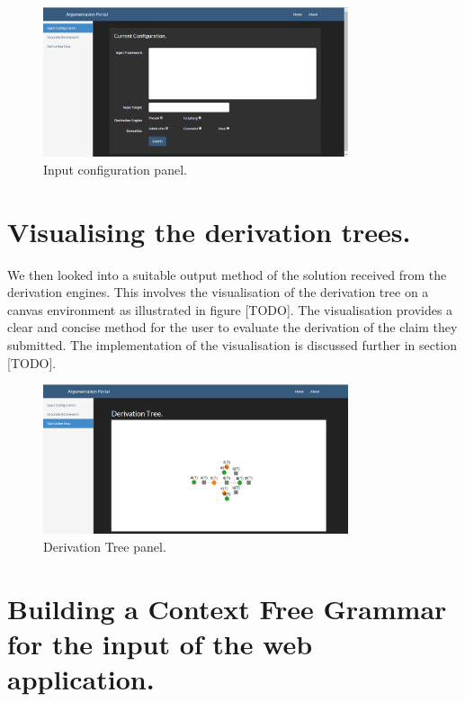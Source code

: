 \begin{figure}[h]
    \centering
    \includegraphics[width=0.8\textwidth]{argumentationInput.png}
    \caption{Input configuration panel.}
    \label{fig:arg_config}
\end{figure}

\section{Visualising the derivation trees.}

We then looked into a suitable output method of the solution received from the derivation engines. This involves the visualisation of the derivation tree on a canvas environment as illustrated in figure [TODO]. The visualisation provides a clear and concise method for the user to evaluate the derivation of the claim they submitted. The implementation of the visualisation is discussed further in section [TODO].

\begin{figure}[h]
    \centering
    \includegraphics[width=0.8\textwidth]{argumentationOutput.png}
    \caption{Derivation Tree panel.}
    \label{fig:arg_tree}
\end{figure}

\section{Building a Context Free Grammar for the input of the web application.}

